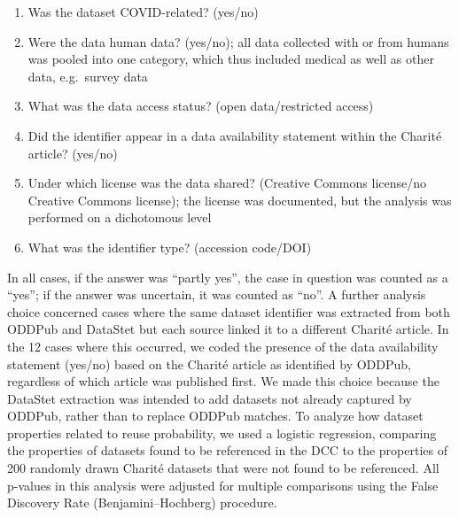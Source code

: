 \documentclass[
  letterpaper,
  DIV=11,
  numbers=noendperiod]{scrartcl}
\begin{document}
\begin{enumerate}
\def\labelenumi{(\arabic{enumi})}
\item
  Was the dataset COVID-related? (yes/no)
\item
  Were the data human data? (yes/no); all data collected with or from
  humans was pooled into one category, which thus included medical as
  well as other data, e.g.~survey data
\item
  What was the data access status? (open data/restricted access)
\item
  Did the identifier appear in a data availability statement within the
  Charité article? (yes/no)
\item
  Under which license was the data shared? (Creative Commons license/no
  Creative Commons license); the license was documented, but the
  analysis was performed on a dichotomous level
\item
  What was the identifier type? (accession code/DOI)
\end{enumerate}

In all cases, if the answer was ``partly yes'', the case in question was
counted as a ``yes''; if the answer was uncertain, it was counted as
``no''. A further analysis choice concerned cases where the same dataset
identifier was extracted from both ODDPub and DataStet but each source
linked it to a different Charité article. In the 12 cases where this
occurred, we coded the presence of the data availability statement
(yes/no) based on the Charité article as identified by ODDPub,
regardless of which article was published first. We made this choice
because the DataStet extraction was intended to add datasets not already
captured by ODDPub, rather than to replace ODDPub matches. To analyze
how dataset properties related to reuse probability, we used a logistic
regression, comparing the properties of datasets found to be referenced
in the DCC to the properties of 200 randomly drawn Charité datasets that
were not found to be referenced. All p-values in this analysis were
adjusted for multiple comparisons using the False Discovery Rate
(Benjamini--Hochberg) procedure.
\end{document}

